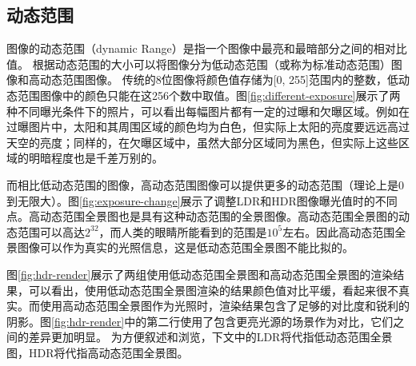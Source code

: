 \subsection{动态范围}

图像的动态范围（dynamic Range）是指一个图像中最亮和最暗部分之间的相对比值\cite{wikipedia}。
根据动态范围的大小可以将图像分为低动态范围（或称为标准动态范围）图像和高动态范围图像。
传统的8位图像将颜色值存储为[0, 255]范围内的整数，低动态范围图像中的颜色只能在这256个数中取值。图\ref{fig:different-exposure}展示了两种不同曝光条件下的照片，可以看出每幅图片都有一定的过曝和欠曝区域。例如在过曝图片中，太阳和其周围区域的颜色均为白色，但实际上太阳的亮度要远远高过天空的亮度；同样的，在欠曝区域中，虽然大部分区域同为黑色，但实际上这些区域的明暗程度也是千差万别的。


而相比低动态范围的图像，高动态范围图像可以提供更多的动态范围（理论上是0到无限大）。图\ref{fig:exposure-change}展示了调整LDR和HDR图像曝光值时的不同点。高动态范围全景图也是具有这种动态范围的全景图像。高动态范围全景图的动态范围可以高达$2^{32}$，而人类的眼睛所能看到的范围是$10^5$左右\cite{wikipedia}。因此高动态范围全景图像可以作为真实的光照信息，这是低动态范围全景图不能比拟的。



图\ref{fig:hdr-render}展示了两组使用低动态范围全景图和高动态范围全景图的渲染结果，可以看出，使用低动态范围全景图渲染的结果颜色值对比平缓，看起来很不真实。而使用高动态范围全景图作为光照时，渲染结果包含了足够的对比度和锐利的阴影。图\ref{fig:hdr-render}中的第二行使用了包含更亮光源的场景作为对比，它们之间的差异更加明显。
为方便叙述和浏览，下文中的LDR将代指低动态范围全景图，HDR将代指高动态范围全景图。

